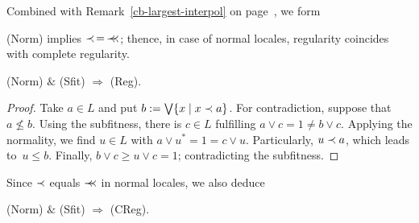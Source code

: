 Combined with Remark~\ref{cb-largest-interpol} on
page~\pageref{cb-largest-interpol}\thinspace, we form

\begin{cor}
  (Norm) implies $\prec \, = \, \prec\mkern-8mu\prec$;
  thence, in case of normal locales, regularity coincides with complete
  regularity.
\end{cor}

\begin{thm}
  (Norm) $\&$ (Sfit) $\Rightarrow$ (Reg).
\end{thm}
\begin{proof}
  Take $a\in L$ and put $b := \bigvee \{x \mid x \prec a\}$.
  For contradiction, suppose that $a\not\le b$.
  Using the subfitness, there is $c\in L$ fulfilling $a \vee c = 1 \ne b \vee
  c$.
  Applying the normality, we find $u\in L$ with $a \vee u^* = 1 = c \vee u$.
  Particularly, $u \prec a$, which leads to~$u \le b$.
  Finally, $b \vee c \ge u \vee c = 1$; contradicting the subfitness.
\end{proof}

Since $\prec$ equals $\prec\mkern-8mu\prec$ in normal locales, we also deduce

\begin{cor}
  (Norm) $\&$ (Sfit) $\Rightarrow$ (CReg).
\end{cor}
